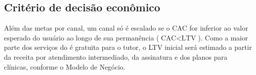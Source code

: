 \subsection{Critério de decisão econômico}

Além das metas por canal, um canal só é escalado se o CAC for inferior ao valor esperado do
usuário ao longo de sua permanência ($\text{CAC} < \text{LTV}$). Como a maior parte dos
serviços do \projeto{} é gratuita para o tutor, o LTV inicial será estimado a partir da
receita por atendimento intermediado, da assinatura e dos planos para clínicas, conforme o
Modelo de Negócio.
